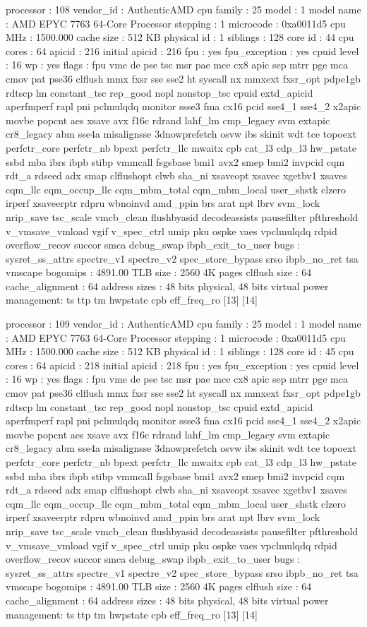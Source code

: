 processor	: 108
vendor_id	: AuthenticAMD
cpu family	: 25
model		: 1
model name	: AMD EPYC 7763 64-Core Processor
stepping	: 1
microcode	: 0xa0011d5
cpu MHz		: 1500.000
cache size	: 512 KB
physical id	: 1
siblings	: 128
core id		: 44
cpu cores	: 64
apicid		: 216
initial apicid	: 216
fpu		: yes
fpu_exception	: yes
cpuid level	: 16
wp		: yes
flags		: fpu vme de pse tsc msr pae mce cx8 apic sep mtrr pge mca cmov pat pse36 clflush mmx fxsr sse sse2 ht syscall nx mmxext fxsr_opt pdpe1gb rdtscp lm constant_tsc rep_good nopl nonstop_tsc cpuid extd_apicid aperfmperf rapl pni pclmulqdq monitor ssse3 fma cx16 pcid sse4_1 sse4_2 x2apic movbe popcnt aes xsave avx f16c rdrand lahf_lm cmp_legacy svm extapic cr8_legacy abm sse4a misalignsse 3dnowprefetch osvw ibs skinit wdt tce topoext perfctr_core perfctr_nb bpext perfctr_llc mwaitx cpb cat_l3 cdp_l3 hw_pstate ssbd mba ibrs ibpb stibp vmmcall fsgsbase bmi1 avx2 smep bmi2 invpcid cqm rdt_a rdseed adx smap clflushopt clwb sha_ni xsaveopt xsavec xgetbv1 xsaves cqm_llc cqm_occup_llc cqm_mbm_total cqm_mbm_local user_shstk clzero irperf xsaveerptr rdpru wbnoinvd amd_ppin brs arat npt lbrv svm_lock nrip_save tsc_scale vmcb_clean flushbyasid decodeassists pausefilter pfthreshold v_vmsave_vmload vgif v_spec_ctrl umip pku ospke vaes vpclmulqdq rdpid overflow_recov succor smca debug_swap ibpb_exit_to_user
bugs		: sysret_ss_attrs spectre_v1 spectre_v2 spec_store_bypass srso ibpb_no_ret tsa vmscape
bogomips	: 4891.00
TLB size	: 2560 4K pages
clflush size	: 64
cache_alignment	: 64
address sizes	: 48 bits physical, 48 bits virtual
power management: ts ttp tm hwpstate cpb eff_freq_ro [13] [14]

processor	: 109
vendor_id	: AuthenticAMD
cpu family	: 25
model		: 1
model name	: AMD EPYC 7763 64-Core Processor
stepping	: 1
microcode	: 0xa0011d5
cpu MHz		: 1500.000
cache size	: 512 KB
physical id	: 1
siblings	: 128
core id		: 45
cpu cores	: 64
apicid		: 218
initial apicid	: 218
fpu		: yes
fpu_exception	: yes
cpuid level	: 16
wp		: yes
flags		: fpu vme de pse tsc msr pae mce cx8 apic sep mtrr pge mca cmov pat pse36 clflush mmx fxsr sse sse2 ht syscall nx mmxext fxsr_opt pdpe1gb rdtscp lm constant_tsc rep_good nopl nonstop_tsc cpuid extd_apicid aperfmperf rapl pni pclmulqdq monitor ssse3 fma cx16 pcid sse4_1 sse4_2 x2apic movbe popcnt aes xsave avx f16c rdrand lahf_lm cmp_legacy svm extapic cr8_legacy abm sse4a misalignsse 3dnowprefetch osvw ibs skinit wdt tce topoext perfctr_core perfctr_nb bpext perfctr_llc mwaitx cpb cat_l3 cdp_l3 hw_pstate ssbd mba ibrs ibpb stibp vmmcall fsgsbase bmi1 avx2 smep bmi2 invpcid cqm rdt_a rdseed adx smap clflushopt clwb sha_ni xsaveopt xsavec xgetbv1 xsaves cqm_llc cqm_occup_llc cqm_mbm_total cqm_mbm_local user_shstk clzero irperf xsaveerptr rdpru wbnoinvd amd_ppin brs arat npt lbrv svm_lock nrip_save tsc_scale vmcb_clean flushbyasid decodeassists pausefilter pfthreshold v_vmsave_vmload vgif v_spec_ctrl umip pku ospke vaes vpclmulqdq rdpid overflow_recov succor smca debug_swap ibpb_exit_to_user
bugs		: sysret_ss_attrs spectre_v1 spectre_v2 spec_store_bypass srso ibpb_no_ret tsa vmscape
bogomips	: 4891.00
TLB size	: 2560 4K pages
clflush size	: 64
cache_alignment	: 64
address sizes	: 48 bits physical, 48 bits virtual
power management: ts ttp tm hwpstate cpb eff_freq_ro [13] [14]

